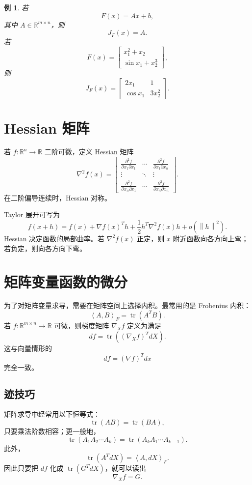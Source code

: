 \documentclass[UTF8,openany,zihao=-4]{ctexbook}
\theoremstyle{cnplain}
\newtheorem{example}{例}[chapter]
\newcommand{\R}{\mathbb R}
\newcommand{\tr}{\operatorname{tr}}
\newcommand{\inner}[2]{\left\langle #1,#2\right\rangle}
\newcommand{\norm}[1]{\left\lVert #1\right\rVert}
\begin{document}
\begin{example}
若
\[
F(x)=Ax+b,
\]
其中 $A\in\R^{m\times n}$，则
\[
J_F(x)=A.
\]
若
\[
F(x)=
\begin{bmatrix}
x_1^2+x_2\\
\sin x_1+x_2^3
\end{bmatrix},
\]
则
\[
J_F(x)=
\begin{bmatrix}
2x_1&1\\
\cos x_1&3x_2^2
\end{bmatrix}.
\]
\end{example}

\section{Hessian 矩阵}

若 $f:\R^n\to\R$ 二阶可微，定义 Hessian 矩阵
\[
\nabla^2 f(x)=
\begin{bmatrix}
\frac{\partial^2 f}{\partial x_1\partial x_1}&\cdots&\frac{\partial^2 f}{\partial x_1\partial x_n}\\
\vdots&\ddots&\vdots\\
\frac{\partial^2 f}{\partial x_n\partial x_1}&\cdots&\frac{\partial^2 f}{\partial x_n\partial x_n}
\end{bmatrix}.
\]
在二阶偏导连续时，Hessian 对称。

Taylor 展开可写为
\[
f(x+h)=f(x)+\nabla f(x)^Th+\frac12 h^T\nabla^2 f(x)h+o(\norm h^2).
\]
Hessian 决定函数的局部曲率。若 $\nabla^2 f(x)$ 正定，则 $x$ 附近函数向各方向上弯；若负定，则向各方向下弯。

\section{矩阵变量函数的微分}

为了对矩阵变量求导，需要在矩阵空间上选择内积。最常用的是 Frobenius 内积：
\[
\inner{A}{B}_F=\tr(A^TB).
\]
若 $f:\R^{m\times n}\to\R$ 可微，则梯度矩阵 $\nabla_X f$ 定义为满足
\[
df=\tr((\nabla_X f)^T dX).
\]
这与向量情形的
\[
df=(\nabla f)^Tdx
\]
完全一致。

\subsection{迹技巧}

矩阵求导中经常用以下恒等式：
\[
\tr(AB)=\tr(BA),
\]
只要乘法阶数相容；更一般地，
\[
\tr(A_1A_2\cdots A_k)=\tr(A_kA_1\cdots A_{k-1}).
\]
此外，
\[
\tr(A^T dX)=\inner{A}{dX}_F.
\]
因此只要把 $df$ 化成 $\tr(G^T dX)$，就可以读出
\[
\nabla_X f=G.
\]
\end{document}

